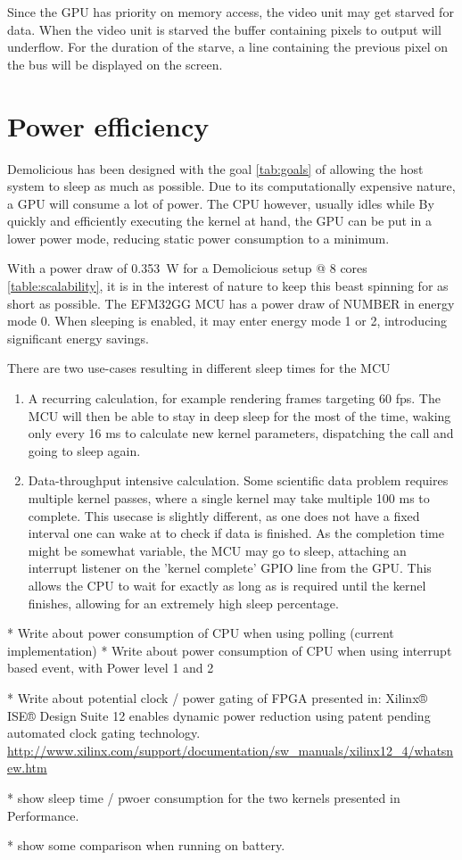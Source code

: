 \documentclass[../main/report.tex]{subfiles}
\begin{document}
Since the GPU has priority on memory access, the video unit may get starved for data.
When the video unit is starved the buffer containing pixels to output will underflow.
For the duration of the starve, a line containing the previous pixel on the bus will be displayed on the screen.

\section{Power efficiency}

Demolicious has been designed with the goal \ref{tab:goals} of allowing the host system to sleep as much as possible.
Due to its computationally expensive nature, a GPU will consume a lot of power.
The CPU however, usually idles while 
By quickly and efficiently executing the kernel at hand, the GPU can be put in a lower power mode, reducing static power consumption to a minimum.

With a power draw of \SI{0.353}{W} for a Demolicious setup @ 8 cores \ref{table:scalability}, it is in the interest of nature to keep this beast spinning for as short as possible.
The EFM32GG MCU has a power draw of NUMBER in energy mode 0.
When sleeping is enabled, it may enter energy mode 1 or 2, introducing significant energy savings.

There are two use-cases resulting in different sleep times for the MCU
\begin{enumerate}
  \item
    A recurring calculation, for example rendering frames targeting 60 fps.
    The MCU will then be able to stay in deep sleep for the most of the time, waking only every 16 ms to calculate new kernel parameters, dispatching the call and going to sleep again.
  \item
    Data-throughput intensive calculation.
    Some scientific data problem requires multiple kernel passes, where a single kernel may take multiple 100 ms to complete.
    This usecase is slightly different, as one does not have a fixed interval one can wake at to check if data is finished.
    As the completion time might be somewhat variable, the MCU may go to sleep, attaching an interrupt listener on the 'kernel complete' GPIO line from the GPU.
    This allows the CPU to wait for exactly as long as is required until the kernel finishes, allowing for an extremely high sleep percentage.
\end{enumerate}


* Write about power consumption of CPU when using polling (current implementation)
* Write about power consumption of CPU when using interrupt based event, with Power level 1 and 2

* Write about potential clock / power gating of FPGA presented in:
Xilinx® ISE® Design Suite 12 enables dynamic power reduction using patent pending automated clock gating technology.
\url{http://www.xilinx.com/support/documentation/sw_manuals/xilinx12_4/whatsnew.htm}

* show sleep time / pwoer consumption for the two kernels presented in Performance.

* show some comparison when running on battery.
\end{document}
